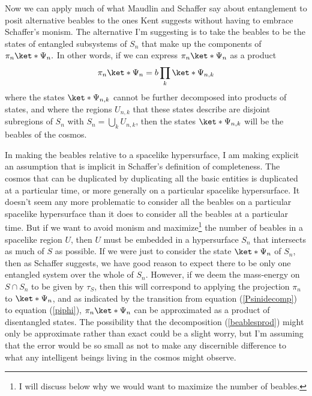 Now we can apply much of what Maudlin and Schaffer say about entanglement to posit alternative beables to the ones Kent suggests without having to embrace Schaffer's monism. The alternative I'm suggesting is to take the beables to be the states of entangled subsystems of $S_n$ that make up the components of $\pi_n\ket*{\Psi_n}.$ In other words, if we can express $\pi_n\ket*{\Psi_n}$ as a product 
\begin{equation}\label{beablesprod}
\pi_n\ket*{\Psi_n}=b\prod_k \ket*{\Psi_{n,k}}
\end{equation}
where the states $\ket*{\Psi_{n,k}}$ cannot be further decomposed into products of states, and where the regions $U_{n,k}$ that these states describe are disjoint subregions of $S_n$ with $S_n=\bigcup_k U_{n,k}$, then the states $\ket*{\Psi_{n,k}}$ will be the beables of the cosmos.

In making the beables relative to a spacelike hypersurface, I am making explicit an assumption that is implicit in Schaffer's definition of completeness. The cosmos that can be duplicated by duplicating all the basic entities is duplicated at a particular time, or more generally on a particular spacelike hypersurface. It doesn't seem any more problematic to consider all the beables on a particular spacelike hypersurface than it does to consider all the beables at a particular time. But if we want to avoid monism and maximize\footnote{I will discuss below why we would want to maximize the number of beables.} the number of beables in a spacelike region  $U$, then $U$ must be embedded in a hypersurface $S_n$ that intersects as much of $S$ as possible. If we were just to consider the state $\ket*{\Psi_n}$ of $S_n$, then as Schaffer suggests, we have good reason to expect there to be only one entangled system over the whole of $S_n$. However, if we deem the mass-energy on $S\cap S_n$ to be given by $\tau_S$, then this will correspond to applying the projection $\pi_n$ to $\ket*{\Psi_n}$, and as indicated by  the transition from equation (\ref{Psinidecomp}) to equation (\ref{piphi}), $\pi_n\ket*{\Psi_n}$ can be approximated as a product of disentangled states. The possibility that the decomposition (\ref{beablesprod}) might only be approximate rather than exact could be a slight worry, but I'm assuming that the error would be so small as not to make any discernible difference to what any intelligent beings living in the cosmos might observe. 

